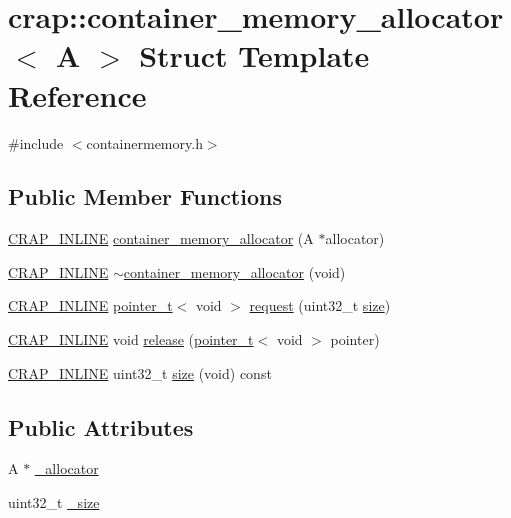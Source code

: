 \hypertarget{structcrap_1_1container__memory__allocator}{}\section{crap\+:\+:container\+\_\+memory\+\_\+allocator$<$ A $>$ Struct Template Reference}
\label{structcrap_1_1container__memory__allocator}


{\ttfamily \#include $<$containermemory.\+h$>$}

\subsection*{Public Member Functions}
\begin{DoxyCompactItemize}
\item 
\hyperlink{config__x86_8h_a5a40526b8d842e7ff731509998bb0f1c}{C\+R\+A\+P\+\_\+\+I\+N\+L\+I\+N\+E} \hyperlink{structcrap_1_1container__memory__allocator_a9a27ff691852615b2e9a680866ce4cbe}{container\+\_\+memory\+\_\+allocator} (A $\ast$allocator)
\item 
\hyperlink{config__x86_8h_a5a40526b8d842e7ff731509998bb0f1c}{C\+R\+A\+P\+\_\+\+I\+N\+L\+I\+N\+E} \hyperlink{structcrap_1_1container__memory__allocator_ae442c6e21081a592f88c474ae5f6e03b}{$\sim$container\+\_\+memory\+\_\+allocator} (void)
\item 
\hyperlink{config__x86_8h_a5a40526b8d842e7ff731509998bb0f1c}{C\+R\+A\+P\+\_\+\+I\+N\+L\+I\+N\+E} \hyperlink{structcrap_1_1pointer__t}{pointer\+\_\+t}$<$ void $>$ \hyperlink{structcrap_1_1container__memory__allocator_a38d4f76005cf5686466c9c3de1879d98}{request} (uint32\+\_\+t \hyperlink{structcrap_1_1container__memory__allocator_a6f723fb0df67f37b9158355d393a1af7}{size})
\item 
\hyperlink{config__x86_8h_a5a40526b8d842e7ff731509998bb0f1c}{C\+R\+A\+P\+\_\+\+I\+N\+L\+I\+N\+E} void \hyperlink{structcrap_1_1container__memory__allocator_ab07f891012fafa4ff9dff7a1a6cdd04e}{release} (\hyperlink{structcrap_1_1pointer__t}{pointer\+\_\+t}$<$ void $>$ pointer)
\item 
\hyperlink{config__x86_8h_a5a40526b8d842e7ff731509998bb0f1c}{C\+R\+A\+P\+\_\+\+I\+N\+L\+I\+N\+E} uint32\+\_\+t \hyperlink{structcrap_1_1container__memory__allocator_a6f723fb0df67f37b9158355d393a1af7}{size} (void) const 
\end{DoxyCompactItemize}
\subsection*{Public Attributes}
\begin{DoxyCompactItemize}
\item 
A $\ast$ \hyperlink{structcrap_1_1container__memory__allocator_a6c4b2c56ca010ac510a93d4f5581ba94}{\+\_\+allocator}
\item 
uint32\+\_\+t \hyperlink{structcrap_1_1container__memory__allocator_afb1717450eb7b0b9d03321fa73a5150f}{\+\_\+size}
\end{DoxyCompactItemize}


